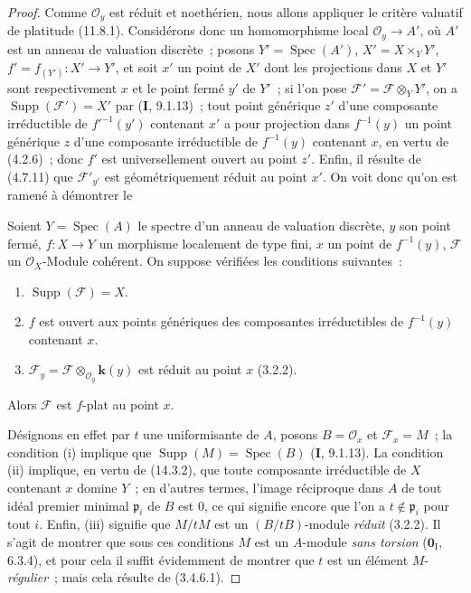 \begin{proof}
Comme $\mathcal O_y$ est réduit et noethérien, nous allons appliquer le critère
valuatif de platitude (11.8.1). Considérons donc un homomorphisme local
$\mathcal O_y\to A'$, où $A'$ est un anneau de valuation discrète~; posons
$Y'=\operatorname{Spec}(A')$, $X'=X\times_Y Y'$, $f'=f_{(Y')}:X'\to Y'$, et
soit $x'$ un point de $X'$ dont les projections dans $X$ et $Y'$ sont
respectivement $x$ et le point fermé $y'$ de $Y'$~; si l'on pose
$\mathcal F'=\mathcal F\otimes_Y Y'$, on a
$\operatorname{Supp}(\mathcal F')=X'$ par (\textbf{I}, 9.1.13)~; tout point
générique $z'$ d'une composante irréductible de $f'^{-1}(y')$ contenant $x'$ a
pour projection dans $f^{-1}(y)$ un point générique $z$ d'une composante
irréductible de $f^{-1}(y)$ contenant $x$, en vertu de (4.2.6)~; donc $f'$ est
universellement ouvert au point $z'$. Enfin, il résulte de (4.7.11) que
$\mathcal F'_{y'}$ est géométriquement réduit au point $x'$. On voit donc qu'on
est ramené à démontrer le

\begin{lemma}[15.2.2.1]
\label{IV.15.2.2.1-fr}
Soient $Y=\operatorname{Spec}(A)$ le spectre d'un anneau de valuation discrète,
$y$ son point fermé, $f:X\to Y$ un morphisme localement de type fini, $x$ un
point de $f^{-1}(y)$, $\mathcal F$ un $\mathcal O_X$-Module cohérent. On suppose
vérifiées les conditions suivantes~:
\begin{enumerate}[label=(\roman*)]
  \item $\operatorname{Supp}(\mathcal F)=X$.
  \item $f$ est ouvert aux points génériques des composantes irréductibles de
  $f^{-1}(y)$ contenant $x$.
  \item $\mathcal F_y=\mathcal F\otimes_{\mathcal O_y}\mathbf{k}(y)$ est réduit
  au point $x$ (3.2.2).
\end{enumerate}
Alors $\mathcal F$ est $f$-plat au point $x$.
\end{lemma}

Désignons en effet par $t$ une uniformisante de $A$, posons $B=\mathcal O_x$ et
$\mathcal F_x=M$~; la condition (i) implique que
$\operatorname{Supp}(M)=\operatorname{Spec}(B)$ (\textbf{I}, 9.1.13). La
condition (ii) implique, en vertu de (14.3.2), que toute composante irréductible
de $X$ contenant $x$ domine $Y$~; en d'autres termes, l'image réciproque dans $A$
de tout idéal premier minimal $\mathfrak p_i$ de $B$ est $0$, ce qui signifie
encore que l'on a $t\notin\mathfrak p_i$ pour tout $i$. Enfin, (iii) signifie que
$M/tM$ est un $(B/tB)$-module \emph{réduit} (3.2.2). Il s'agit de montrer que
sous ces conditions $M$ est un $A$-module \emph{sans torsion}
($\mathbf{0}_{\mathrm I}$, 6.3.4), et pour cela il suffit évidemment de montrer
que $t$ est un élément $M$-\emph{régulier}~; mais cela résulte de (3.4.6.1).
\end{proof}

